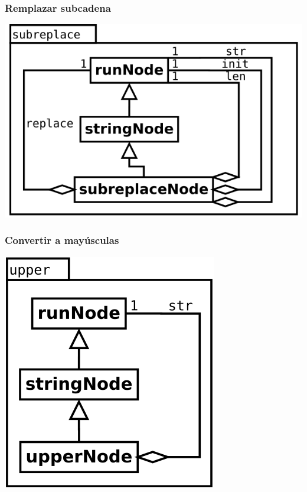 \subsubsection {Remplazar subcadena}
\begin{center}
\includegraphics[scale=0.4]{subreplace.png} \\
\end{center}

\subsubsection {Convertir a mayúsculas}
\begin{center}
\includegraphics[scale=0.4]{upper.png} \\
\end{center}

